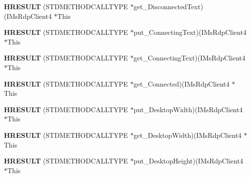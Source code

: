 \begin{DoxyCompactItemize}
\item 
\mbox{\label{struct_i_ms_rdp_client4_vtbl_ac1c17018caf9175eb4a0baabe97189e7}} 
{\bfseries H\+R\+E\+S\+U\+LT} (S\+T\+D\+M\+E\+T\+H\+O\+D\+C\+A\+L\+L\+T\+Y\+PE $\ast$get\+\_\+\+Disconnected\+Text)(I\+Ms\+Rdp\+Client4 $\ast$This
\item 
\mbox{\label{struct_i_ms_rdp_client4_vtbl_ac257f829c7fc612041049b558f0b5009}} 
{\bfseries H\+R\+E\+S\+U\+LT} (S\+T\+D\+M\+E\+T\+H\+O\+D\+C\+A\+L\+L\+T\+Y\+PE $\ast$put\+\_\+\+Connecting\+Text)(I\+Ms\+Rdp\+Client4 $\ast$This
\item 
\mbox{\label{struct_i_ms_rdp_client4_vtbl_aa4cd8436060d2b2a0d7b64b38a7e4fcf}} 
{\bfseries H\+R\+E\+S\+U\+LT} (S\+T\+D\+M\+E\+T\+H\+O\+D\+C\+A\+L\+L\+T\+Y\+PE $\ast$get\+\_\+\+Connecting\+Text)(I\+Ms\+Rdp\+Client4 $\ast$This
\item 
\mbox{\label{struct_i_ms_rdp_client4_vtbl_a711fd4651a37dc27ba7686742f704d83}} 
{\bfseries H\+R\+E\+S\+U\+LT} (S\+T\+D\+M\+E\+T\+H\+O\+D\+C\+A\+L\+L\+T\+Y\+PE $\ast$get\+\_\+\+Connected)(I\+Ms\+Rdp\+Client4 $\ast$This
\item 
\mbox{\label{struct_i_ms_rdp_client4_vtbl_aa5574d7f819dbc516f0d5d27e29b7fcb}} 
{\bfseries H\+R\+E\+S\+U\+LT} (S\+T\+D\+M\+E\+T\+H\+O\+D\+C\+A\+L\+L\+T\+Y\+PE $\ast$put\+\_\+\+Desktop\+Width)(I\+Ms\+Rdp\+Client4 $\ast$This
\item 
\mbox{\label{struct_i_ms_rdp_client4_vtbl_aa4f33b63ac7a1da2ee0c349943001d35}} 
{\bfseries H\+R\+E\+S\+U\+LT} (S\+T\+D\+M\+E\+T\+H\+O\+D\+C\+A\+L\+L\+T\+Y\+PE $\ast$get\+\_\+\+Desktop\+Width)(I\+Ms\+Rdp\+Client4 $\ast$This
\item 
\mbox{\label{struct_i_ms_rdp_client4_vtbl_aabcadbec72a4195a42f0f88925a85ced}} 
{\bfseries H\+R\+E\+S\+U\+LT} (S\+T\+D\+M\+E\+T\+H\+O\+D\+C\+A\+L\+L\+T\+Y\+PE $\ast$put\+\_\+\+Desktop\+Height)(I\+Ms\+Rdp\+Client4 $\ast$This
\item 
\mbox{\label{struct_i_ms_rdp_client4_vtbl_add4a1386d447ade4f0edc241ee1405e6}} 

\end{DoxyCompactItemize}
